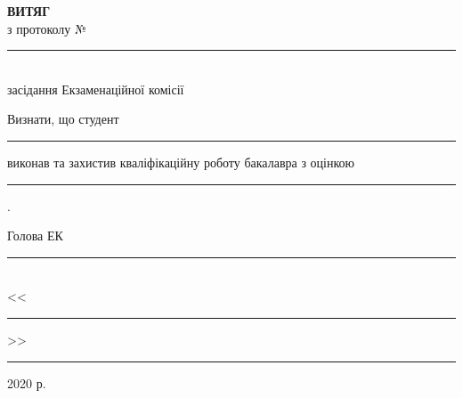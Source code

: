 \documentclass[a4paper, 14pt]{article}
\numberwithin{equation}{section}
\numberwithin{table}{section}
\begin{document}
	\begin{titlepage}
		\renewcommand{\baselinestretch}{1.0}
		\newcommand{\ul}[1]{\rule{#1}{0.1pt}}
		\begin{spacing}{1.8}
			\vspace*{4.5cm}
			{\center
				{\bf ВИТЯГ}\\
				з протоколу № \ul{2.4cm}\\
				засідання Екзаменаційної комісії\\[2cm]}
			{\noindent
				Визнати, що студент \ul{7.2cm} виконав та захистив кваліфікаційну роботу бакалавра з оцінкою \ul{7.2cm} .\\[1cm]}
			{\flushright
				Голова ЕК \ul{7.8cm}\\
				<<\ul{1cm}>> \ul{4cm} 2020 р.\\}
		\end{spacing}
	\end{titlepage}
	

	
\end{document}
